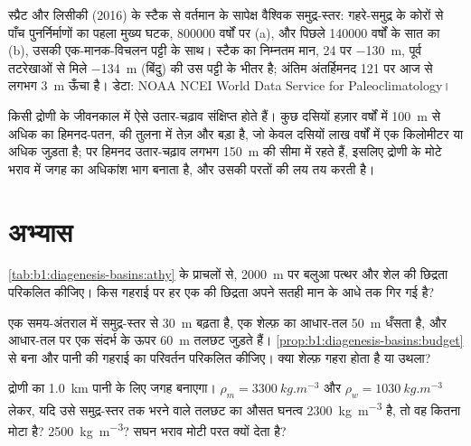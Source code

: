\begin{omfigure}
{\small स्प्रैट और लिसीकी (2016) के स्टैक से वर्तमान के सापेक्ष वैश्विक समुद्र-स्तर: गहरे-समुद्र के कोरों से पाँच पुनर्निर्माणों का पहला मुख्य घटक, \num{800000} वर्षों पर (a), और पिछले \num{140000} वर्षों के सात का (b), उसकी एक-मानक-विचलन पट्टी के साथ। स्टैक का निम्नतम मान, \qty{24}{\ka} पर \qty{-130}{m}, पूर्व तटरेखाओं से मिले \qty{-134}{m} (बिंदु) की उस पट्टी के भीतर है; अंतिम अंतर्हिमनद \qty{121}{\ka} पर आज से लगभग \qty{3}{m} ऊँचा है। डेटा: NOAA NCEI World Data Service for Paleoclimatology।}
\label{fig:b1:diagenesis-basins:sea-level}
\end{omfigure}

किसी द्रोणी के जीवनकाल में ऐसे उतार-चढ़ाव संक्षिप्त होते हैं। कुछ दसियों हज़ार वर्षों में \qty{100}{m} से अधिक का हिमनद-पतन,  की तुलना में तेज़ और बड़ा है, जो केवल दसियों लाख वर्षों में एक किलोमीटर या अधिक जुड़ता है; पर हिमनद उतार-चढ़ाव लगभग \qty{150}{m} की सीमा में रहते हैं, इसलिए द्रोणी के मोटे भराव में जगह का अधिकांश भाग  बनाता है, और  उसकी परतों की लय तय करती है।

\section{अभ्यास}

\begin{exercise}[$\star$]\label{exo:b1:diagenesis-basins:1}
\cref{tab:b1:diagenesis-basins:athy} के प्राचलों से, \qty{2000}{m} पर बलुआ पत्थर और शेल की छिद्रता परिकलित कीजिए। किस गहराई पर हर एक की छिद्रता अपने सतही मान के आधे तक गिर गई है?
\end{exercise}

\begin{exercise}[$\star$]\label{exo:b1:diagenesis-basins:2}
एक समय-अंतराल में समुद्र-स्तर  से \qty{30}{m} बढ़ता है, एक शेल्फ़ का आधार-तल \qty{50}{m} धँसता है, और आधार-तल पर एक संदर्भ के ऊपर \qty{60}{m} तलछट जुड़ते हैं। \cref{prop:b1:diagenesis-basins:budget} से बना  और पानी की गहराई का परिवर्तन परिकलित कीजिए। क्या शेल्फ़ गहरा होता है या उथला?
\end{exercise}

\begin{exercise}[$\star$]\label{exo:b1:diagenesis-basins:3}
द्रोणी का  \qty{1.0}{km} पानी के लिए जगह बनाएगा। $\rho_m = \qty{3300}{kg.m^{-3}}$ और $\rho_w = \qty{1030}{kg.m^{-3}}$ लेकर, यदि उसे समुद्र-स्तर तक भरने वाले तलछट का औसत घनत्व \qty{2300}{kg.m^{-3}} है, तो वह कितना मोटा है? \qty{2500}{kg.m^{-3}}? सघन भराव मोटी परत क्यों देता है?
\end{exercise}

